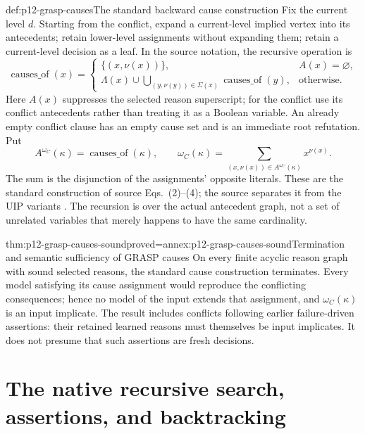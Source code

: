 \begin{hbmethod}{def:p12-grasp-causes}{The standard backward cause construction}
Fix the current level \(d\).  Starting from the conflict, expand a
current-level implied vertex into its antecedents; retain lower-level
assignments without expanding them; retain a current-level decision as a
leaf.  In the source notation, the recursive operation is
\[
\operatorname{causes\_of}(x)=
\begin{cases}
 \{(x,\nu(x))\},&A(x)=\varnothing,\\
 \Lambda(x)\cup
 \displaystyle\bigcup_{(y,\nu(y))\in\Sigma(x)}
        \operatorname{causes\_of}(y),&\text{otherwise}.
\end{cases}
\]
Here \(A(x)\) suppresses the selected reason superscript; for the conflict
use its conflict antecedents rather than treating it as a Boolean variable.
An already empty conflict clause has an empty cause set and is an immediate
root refutation.  Put
\[
 A^{\omega_C}(\kappa)=\operatorname{causes\_of}(\kappa),\qquad
 \omega_C(\kappa)=
   \sum_{(x,\nu(x))\in A^{\omega_C}(\kappa)}x^{\nu(x)}.
\]
The sum is the disjunction of the assignments' opposite literals.  These are
the standard construction of source Eqs.~(2)--(4); the source separates it
from the UIP variants
\cite[Sec.~3; Eqs.~(2)--(4)]{MarquesSilvaSakallah1999}.
The recursion is over the actual antecedent graph, not a set of unrelated
variables that merely happens to have the same cardinality.
\end{hbmethod}

\begin{hblemma}{thm:p12-grasp-causes-sound}{proved=annex:p12-grasp-causes-sound}{Termination and semantic sufficiency of GRASP causes}
On every finite acyclic reason graph with sound selected reasons, the standard
cause construction terminates.  Every model satisfying its cause assignment
would reproduce the conflicting consequences; hence no model of the input
extends that assignment, and \(\omega_C(\kappa)\) is an input implicate.
The result includes conflicts following earlier failure-driven assertions:
their retained learned reasons must themselves be input implicates.  It does
not presume that such assertions are fresh decisions.
\end{hblemma}

\section{The native recursive search, assertions, and backtracking}


